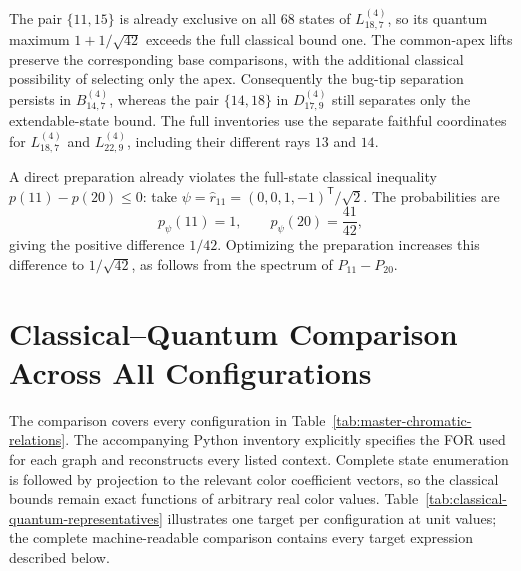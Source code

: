 \documentclass[aps,pra,reprint,superscriptaddress,longbibliography,nofootinbib,floatfix,10pt]{revtex4-2}
\theoremstyle{definition}\newtheorem{definition}[theorem]{Definition}
\theoremstyle{remark}\newtheorem{remark}[theorem]{Remark}
\begin{document}
The pair $\{11,15\}$ is already exclusive on all $68$ states of $L_{18,7}^{(4)}$, so its quantum maximum $1+1/\sqrt{42}$ exceeds the full classical bound one. The common-apex lifts preserve the corresponding base comparisons, with the additional classical possibility of selecting only the apex. Consequently the bug-tip separation persists in $B_{14,7}^{(4)}$, whereas the pair $\{14,18\}$ in $D_{17,9}^{(4)}$ still separates only the extendable-state bound. The full inventories use the separate faithful coordinates for $L_{18,7}^{(4)}$ and $L_{22,9}^{(4)}$, including their different rays $13$ and $14$.



A direct preparation already violates the full-state classical inequality $p(11)-p(20)\le0$: take $\psi=\hat r_{11}=(0,0,1,-1)^{\mathsf T}/\sqrt2$. The probabilities are
\begin{equation}\label{eq:L22-order-explicit-witness}
p_\psi(11)=1,\qquad p_\psi(20)=\frac{41}{42},
\end{equation}
giving the positive difference $1/42$. Optimizing the preparation increases this difference to $1/\sqrt{42}$, as follows from the spectrum of $P_{11}-P_{20}$.

\section{Classical--Quantum Comparison Across All Configurations}\label{sec:classical-census}

The comparison covers every configuration in Table~\ref{tab:master-chromatic-relations}. The accompanying Python inventory explicitly specifies the FOR used for each graph and reconstructs every listed context. Complete state enumeration is followed by projection to the relevant color coefficient vectors, so the classical bounds remain exact functions of arbitrary real color values. Table~\ref{tab:classical-quantum-representatives} illustrates one target per configuration at unit values; the complete machine-readable comparison contains every target expression described below.
\end{document}
